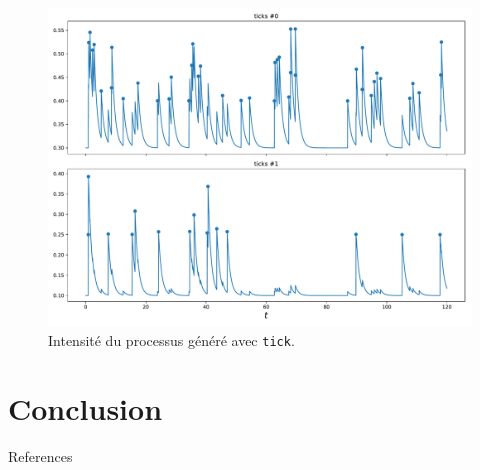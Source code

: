 \documentclass{beamer}
\begin{document}
\begin{frame}
\begin{figure}
	\includegraphics[width=\linewidth]{../results/intensity_baseHawkes2D_asymmetrical.pdf}
	\caption{Intensité du processus généré avec \texttt{tick}.}
\end{figure}
\end{frame}


\section{Conclusion}

\begin{frame}[t,allowframebreaks]{References}
	\printbibliography
\end{frame}
\end{document}
